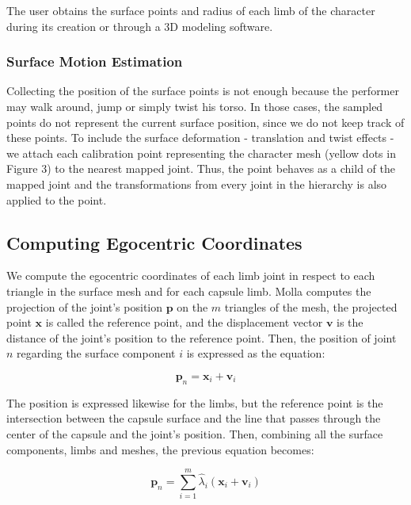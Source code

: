 \documentclass{vgtc}
\begin{document}
The user obtains the surface points and radius of each limb of the
character during its creation or through a 3D modeling software.

    \subsubsection{Surface Motion
Estimation}\label{surface-motion-estimation}

Collecting the position of the surface points is not enough because the
performer may walk around, jump or simply twist his torso. In those
cases, the sampled points do not represent the current surface position,
since we do not keep track of these points. To include the surface
deformation - translation and twist effects - we attach each calibration
point representing the character mesh (yellow dots in Figure 3) to the
nearest mapped joint. Thus, the point behaves as a child of the mapped
joint and the transformations from every joint in the hierarchy is also
applied to the point.

    \subsection{Computing Egocentric
Coordinates}\label{computing-egocentric-coordinates}

We compute the egocentric coordinates of each limb joint in respect to
each triangle in the surface mesh and for each capsule limb. Molla
computes the projection of the joint's position \(\mathbf{p}\) on the
\(m\) triangles of the mesh, the projected point \(\mathbf{x}\) is
called the reference point, and the displacement vector \(\mathbf{v}\)
is the distance of the joint's position to the reference point. Then,
the position of joint \(n\) regarding the surface component \(i\) is
expressed as the equation:

\begin{equation}
\label{eq:egocoord_jointpos1}
\mathbf{p}_n = \mathbf{x}_i + \mathbf{v}_i
\end{equation}

The position is expressed likewise for the limbs, but the reference
point is the intersection between the capsule surface and the line that
passes through the center of the capsule and the joint's position. Then,
combining all the surface components, limbs and meshes, the previous
equation becomes:

\begin{equation}
\label{eq:egocoord_jointpos2}
\mathbf{p}_n = \sum_{i=1}^{m}\hat{\lambda}_{i}(\mathbf{x}_i + \mathbf{v}_i)
\end{equation}
\end{document}
